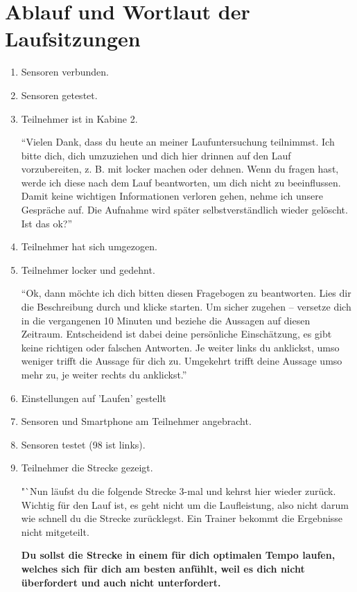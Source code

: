 \section{Ablauf und Wortlaut der  Laufsitzungen} 
\begin{enumerate}
\item Sensoren verbunden.
\item Sensoren getestet. 
\item Teilnehmer ist in Kabine 2. 

"`Vielen Dank, dass du heute an meiner Laufuntersuchung teilnimmst. Ich bitte dich, dich umzuziehen und dich hier drinnen auf den Lauf vorzubereiten, z. B. mit locker machen oder dehnen. Wenn du fragen hast, werde ich diese nach dem Lauf beantworten, um dich nicht zu beeinflussen. Damit keine wichtigen Informationen verloren gehen, nehme ich unsere Gespräche auf. Die Aufnahme wird später selbstverständlich wieder gelöscht. Ist das ok?"'

\item Teilnehmer hat sich umgezogen. 
\item Teilnehmer locker und gedehnt. 

"`Ok, dann möchte ich dich bitten diesen Fragebogen zu beantworten. Lies dir die Beschreibung durch und klicke starten. Um sicher zugehen – versetze dich in die vergangenen 10 Minuten und beziehe die Aussagen auf diesen Zeitraum. Entscheidend ist dabei deine persönliche Einschätzung, es gibt keine richtigen oder falschen Antworten. Je weiter links du anklickst, umso weniger trifft die Aussage für dich zu. Umgekehrt trifft deine Aussage umso mehr zu, je weiter rechts du anklickst."' 

\item Einstellungen auf 'Laufen' gestellt
\item Sensoren und Smartphone am Teilnehmer angebracht. 
\item Sensoren testet (98 ist links). 
\item Teilnehmer die Strecke gezeigt. 

"`Nun läufst du die folgende Strecke 3-mal und kehrst hier wieder zurück. Wichtig für den Lauf ist, es geht nicht um die Laufleistung, also nicht darum wie schnell du die Strecke zurücklegst. Ein Trainer bekommt die Ergebnisse nicht mitgeteilt. 

\textbf{Du sollst die Strecke in einem für dich optimalen Tempo laufen, welches sich für dich am besten anfühlt, weil es dich nicht überfordert und auch nicht unterfordert.}


\end{enumerate}
